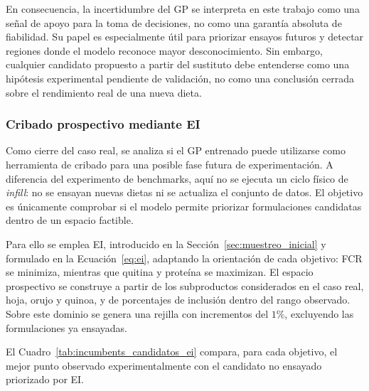 En consecuencia, la incertidumbre del GP se interpreta en este trabajo como una señal de apoyo para la toma de decisiones, no como una garantía absoluta de fiabilidad. Su papel es especialmente útil para priorizar ensayos futuros y detectar regiones donde el modelo reconoce mayor desconocimiento. Sin embargo, cualquier candidato propuesto a partir del sustituto debe entenderse como una hipótesis experimental pendiente de validación, no como una conclusión cerrada sobre el rendimiento real de una nueva dieta.

\subsubsection{Cribado prospectivo mediante EI}\label{subsubsec:preinfill_caso_real}

Como cierre del caso real, se analiza si el GP entrenado puede utilizarse como herramienta de cribado para una posible fase futura de experimentación. A diferencia del experimento de benchmarks, aquí no se ejecuta un ciclo físico de \emph{infill}: no se ensayan nuevas dietas ni se actualiza el conjunto de datos. El objetivo es únicamente comprobar si el modelo permite priorizar formulaciones candidatas dentro de un espacio factible.

Para ello se emplea EI, introducido en la Sección~\ref{sec:muestreo_inicial} y formulado en la Ecuación~\ref{eq:ei}, adaptando la orientación de cada objetivo: FCR se minimiza, mientras que quitina y proteína se maximizan. El espacio prospectivo se construye a partir de los subproductos considerados en el caso real, hoja, orujo y quinoa, y de porcentajes de inclusión dentro del rango observado. Sobre este dominio se genera una rejilla con incrementos del \(1\%\), excluyendo las formulaciones ya ensayadas.

El Cuadro~\ref{tab:incumbents_candidatos_ei} compara, para cada objetivo, el mejor punto observado experimentalmente con el candidato no ensayado priorizado por EI.

